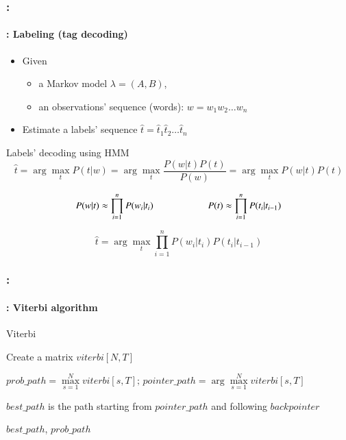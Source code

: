 \documentclass[xcolor=table]{beamer}
\begin{document}
\begin{frame}
	\frametitle{\insertshortsubtitle: \insertsection}
	\framesubtitle{\insertsubsection: Labeling (tag decoding)}
	
	\begin{itemize}
			\item Given
			\begin{itemize}
					\item a Markov model $\lambda = (A, B)$,
					\item an observations' sequence (words): $w = w_1 w_2 \ldots w_n$
				\end{itemize}
			\item Estimate a labels' sequence $\hat{t} = \hat{t}_1 \hat{t}_2 \ldots \hat{t}_n$
		\end{itemize}
	
	\begin{block}{Labels' decoding using HMM}
			\[
			\hat{t} = \arg\max\limits_t P(t | w) = \arg\max\limits_t \frac{P(w|t) P(t)}{P(w)} = \arg\max\limits_t P(w|t) P(t)%
			\]
			
			\[ 
			P(w | t) \approx \prod\limits_{i=1}^n P(w_i|t_i) 
			\hskip2cm
			P(t) \approx \prod\limits_{i=1}^n P(t_i|t_{i-1}) 
			\]
			
			\[
			\hat{t} = \arg\max\limits_t \prod\limits_{i=1}^n P(w_i|t_i) P(t_i|t_{i-1})
			\]
		\end{block}
\end{frame}

\begin{frame}
	\frametitle{\insertshortsubtitle: \insertsection}
	\framesubtitle{\insertsubsection: Viterbi algorithm}
	
	\begin{block}{Viterbi}
			\scriptsize
			\begin{algorithm}[H]
					
					Create a matrix $viterbi[N, T]$\;
					
					
					
					$prob\_path = \max\limits_{s=1}^N viterbi[s, T];\, pointer\_path = \arg\max\limits_{s=1}^N viterbi[s, T]$\;
					
					$best\_path$ is the path starting from $pointer\_path$ and following $backpointer$
					
					\Return $best\_path$, $prob\_path$\;
					
				\end{algorithm}
		\end{block}
	
\end{frame}
\end{document}
